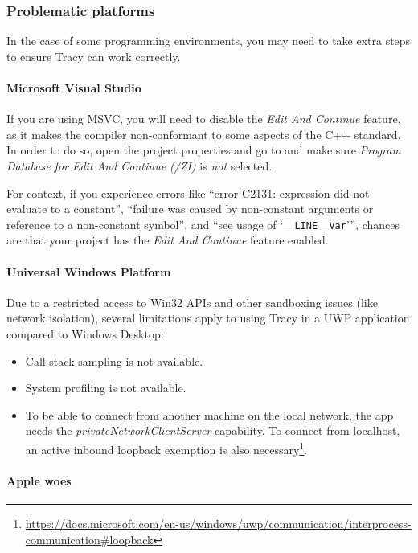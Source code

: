 \documentclass[hidelinks,titlepage,a4paper,twoside]{article}
\begin{document}
\subsubsection{Problematic platforms}

In the case of some programming environments, you may need to take extra steps to ensure Tracy can work correctly.

\paragraph{Microsoft Visual Studio}

If you are using MSVC, you will need to disable the \emph{Edit And Continue} feature, as it makes the compiler non-conformant to some aspects of the C++ standard. In order to do so, open the project properties and go to  and make sure \emph{Program Database for Edit And Continue (/ZI)} is \emph{not} selected.

For context, if you experience errors like \enquote{error C2131: expression did not evaluate to a constant}, \enquote{failure was caused by non-constant arguments or reference to a non-constant symbol}, and \enquote{see usage of \enquote{\texttt{\_\_LINE\_\_Var}}}, chances are that your project has the \emph{Edit And Continue} feature enabled.

\paragraph{Universal Windows Platform}

Due to a restricted access to Win32 APIs and other sandboxing issues (like network isolation), several limitations apply to using Tracy in a UWP application compared to Windows Desktop:

\begin{itemize}
\item Call stack sampling is not available.
\item System profiling is not available.
\item To be able to connect from another machine on the local network, the app needs the \emph{privateNetworkClientServer} capability. To connect from localhost, an active inbound loopback exemption is also necessary\footnote{\url{https://docs.microsoft.com/en-us/windows/uwp/communication/interprocess-communication\#loopback}}.
\end{itemize}

\paragraph{Apple woes}
\end{document}

